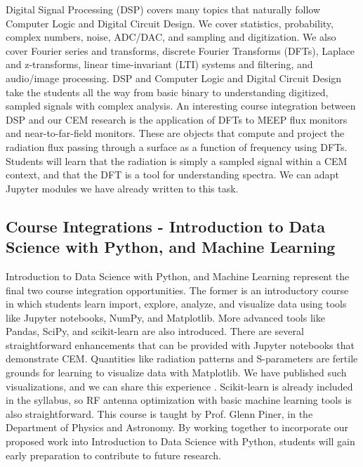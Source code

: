 \documentclass[10pt]{amsart}
\theoremstyle{definition}
\numberwithin{equation}{section}
\begin{document}
Digital Signal Processing (DSP) covers many topics that naturally follow Computer Logic and Digital Circuit Design.  We cover statistics, probability, complex numbers, noise, ADC/DAC, and sampling and digitization.  We also cover Fourier series and transforms, discrete Fourier Transforms (DFTs), Laplace and z-transforms, linear time-invariant (LTI) systems and filtering, and audio/image processing.  DSP and Computer Logic and Digital Circuit Design take the students all the way from basic binary to understanding digitized, sampled signals with complex analysis.  An interesting course integration between DSP and our CEM research is the application of DFTs to MEEP flux monitors and near-to-far-field monitors.  These are objects that compute and project the radiation flux passing through a surface as a function of frequency using DFTs.  Students will learn that the radiation is simply a sampled signal within a CEM context, and that the DFT is a tool for understanding spectra.  We can adapt Jupyter modules we have already written to this task. 

\subsection{Course Integrations - Introduction to Data Science with Python, and Machine Learning}

Introduction to Data Science with Python, and Machine Learning represent the final two course integration opportunities.  The former is an introductory course in which students learn import, explore, analyze, and visualize data using tools like Jupyter notebooks, NumPy, and Matplotlib.  More advanced tools like Pandas, SciPy, and scikit-learn are also introduced.  There are several straightforward enhancements that can be provided with Jupyter notebooks that demonstrate CEM.  Quantities like radiation patterns and S-parameters are fertile grounds for learning to visualize data with Matplotlib.  We have published such visualizations, and we can share this experience \cite{electronics10040415}.  Scikit-learn is already included in the syllabus, so RF antenna optimization with basic machine learning tools is also straightforward.  This course is taught by Prof. Glenn Piner, in the Department of Physics and Astronomy.  By working together to incorporate our proposed work into Introduction to Data Science with Python, students will gain early preparation to contribute to future research.  
\end{document}

